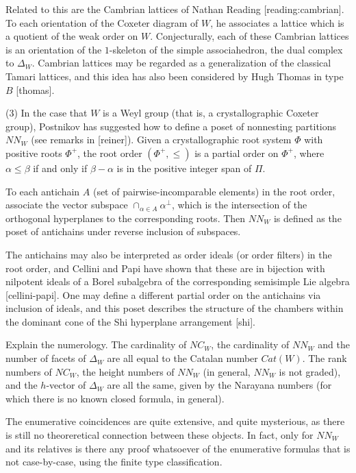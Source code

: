 \documentclass[12pt,letterpaper, reqno]{amsart}
\begin{document}
Related to this are the Cambrian lattices of Nathan Reading
[reading:cambrian]. To each orientation of the Coxeter diagram of
$W$, he associates a lattice which is a quotient of the weak order on
$W$. Conjecturally, each of these Cambrian lattices is an orientation
of the $1$-skeleton of the simple associahedron, the dual complex
to $\Delta_W$. Cambrian lattices may be regarded as a generalization of
the classical Tamari lattices, and this idea has also been considered
by Hugh Thomas in type $B$ [thomas].


(3) In the case that $W$ is a Weyl group (that is, a crystallographic
Coxeter group), Postnikov has suggested how to define a poset of
nonnesting partitions $NN_W$ (see remarks in [reiner]). Given
a crystallographic root system $\Phi$ with positive roots $\Phi^+$,
the root order $(\Phi^+,\leq)$ is a partial order on $\Phi^+$,
where $\alpha\leq\beta$ if and only if $\beta-\alpha$ is in the positive
integer span of $\Pi$.

To each antichain $A$ (set of pairwise-incomparable elements) in
the root order, associate the vector subspace $\cap_{\alpha\in A}
\alpha^{\perp}$, which is the intersection of the orthogonal hyperplanes
to the corresponding roots. Then $NN_W$ is defined as the poset of
antichains under reverse inclusion of subspaces.

The antichains may also be interpreted as order ideals (or order
filters) in the root order, and Cellini and Papi have shown that these
are in bijection with nilpotent ideals of a Borel subalgebra of the
corresponding semisimple Lie algebra [cellini-papi]. One may define
a different partial order on the antichains via inclusion of ideals,
and this poset describes the structure of the chambers within the dominant
cone of the Shi hyperplane arrangement [shi].


\begin{problemblock}

\begin{problem}[1.1]
Explain the numerology. The cardinality of $NC_W$, the cardinality of
$NN_W$ and the number of facets of $\Delta_W$ are all equal to the Catalan
number $Cat(W)$. The rank numbers of $NC_W$, the height numbers of $NN_W$
(in general, $NN_W$ is not graded), and the $h$-vector of $\Delta_W$ are
all the same, given by the Narayana numbers (for which there is no
known closed formula, in general).
\end{problem}

\begin{distinguishedremark}
 The enumerative coincidences are quite
extensive, and quite mysterious, as there is  still no theoreretical
connection between these objects.  In fact, only for $NN_W$ and its
relatives is there any proof whatsoever of the enumerative formulas
that is not case-by-case, using the finite type classification.
\end{distinguishedremark}
\end{problemblock}
\end{document}
